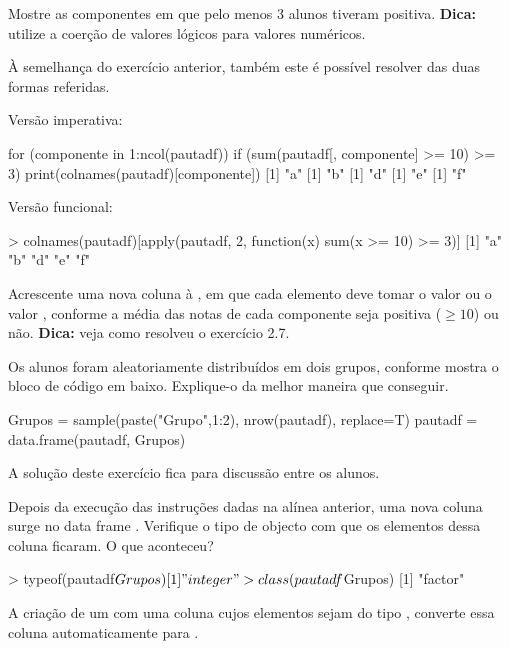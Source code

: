 \documentclass{exam}
\begin{document}
\begin{questions}
\question Mostre as componentes em que pelo menos 3 alunos tiveram positiva. \textbf{Dica:} utilize a coerção de valores lógicos para valores numéricos.

\begin{solution}
	À semelhança do exercício anterior, também este é possível resolver das duas formas referidas.
	
	Versão imperativa:
	\begin{rcode}
		for (componente in 1:ncol(pautadf)) {
		  if (sum(pautadf[, componente] >= 10) >= 3) {
		    print(colnames(pautadf)[componente])
		  }
		}
		[1] "a"
		[1] "b"
		[1] "d"
		[1] "e"
		[1] "f"
	\end{rcode}
	Versão funcional:
	\begin{rcode}
		> colnames(pautadf)[apply(pautadf, 2, function(x) sum(x >= 10) >= 3)]
		[1] "a" "b" "d" "e" "f"
	\end{rcode}
\end{solution}

\question Acrescente uma nova coluna à , em que cada elemento deve tomar o valor  ou o valor , conforme a média das notas de cada componente seja positiva ($\geq 10$) ou não. \textbf{Dica:} veja como resolveu o exercício 2.7.

\begin{solution}
\end{solution}

\question Os alunos foram aleatoriamente distribuídos em dois grupos, conforme mostra o bloco de código em baixo. Explique-o da melhor maneira que conseguir.
\begin{rcode}
	Grupos = sample(paste("Grupo",1:2), nrow(pautadf), replace=T)
	pautadf = data.frame(pautadf, Grupos)
\end{rcode}

\begin{solution}
	A solução deste exercício fica para discussão entre os alunos.
\end{solution}

\question Depois da execução das instruções dadas na alínea anterior, uma nova coluna surge no data frame . Verifique o tipo de objecto com que os elementos dessa coluna ficaram. O que aconteceu?

\begin{solution}
	\begin{rcode}
		> typeof(pautadf$Grupos)
		[1] "integer"
		> class(pautadf$Grupos)
		[1] "factor"
	\end{rcode}
	A criação de um  com uma coluna cujos elementos sejam do tipo , converte essa coluna automaticamente para .
\end{solution}


\end{questions}
\end{document}
